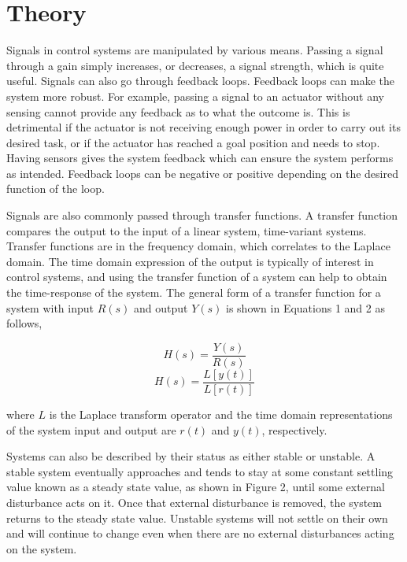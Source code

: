 \documentclass[12pt]{article}
\begin{document}
\section*{\fontsize{12}{12}\selectfont \large Theory}
Signals in control systems are manipulated by various means. Passing a signal through a gain simply increases, or decreases, a signal strength, which is quite useful. Signals can also go through feedback loops. Feedback loops can make the system more robust. For example, passing a signal to an actuator without any sensing cannot provide any feedback as to what the outcome is. This is detrimental if the actuator is not receiving enough power in order to carry out its desired task, or if the actuator has reached a goal position and needs to stop. Having sensors gives the system feedback which can ensure the system performs as intended. Feedback loops can be negative or positive depending on the desired function of the loop. 
\bigskip

Signals are also commonly passed through transfer functions. A transfer function compares the output to the input of a linear system, time-variant systems. Transfer functions are in the frequency domain, which correlates to the Laplace domain. The time domain expression of the output is typically of interest in control systems, and using the transfer function of a system can help to obtain the time-response of the system. The general form of a transfer function for a system with input $R(s)$ and output $Y(s)$ is shown in Equations 1 and 2 as follows,
\bigskip

\begin{equation}
H(s) = \frac{Y(s)}{R(s)} 
\end{equation}
\begin{equation}
H(s) = \frac{L[y(t)]}{L[r(t)]}
\end{equation}
\bigskip

where $L$ is the Laplace transform operator and the time domain representations of the system input and output are $r(t)$ and $y(t)$, respectively.
\bigskip

Systems can also be described by their status as either stable or unstable. A stable system eventually approaches and tends to stay at some constant settling value known as a steady state value, as shown in Figure 2, until some external disturbance acts on it. Once that external disturbance is removed, the system returns to the steady state value. Unstable systems will not settle on their own and will continue to change even when there are no external disturbances acting on the system.
\bigskip
\end{document}
